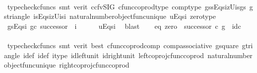 \begin{isabellebody}
\ \ \ \ \isamarkupfalse%
\ {\isacharparenleft}{\kern0pt}typecheck{\isacharunderscore}{\kern0pt}cfuncs{\isacharcomma}{\kern0pt}\ smt\ {\isacharparenleft}{\kern0pt}verit{\isacharcomma}{\kern0pt}\ ccfv{\isacharunderscore}{\kern0pt}SIG{\isacharparenright}{\kern0pt}\ cfunc{\isacharunderscore}{\kern0pt}coprod{\isacharunderscore}{\kern0pt}type\ comp{\isacharunderscore}{\kern0pt}type\ g{\isacharunderscore}{\kern0pt}s{\isacharunderscore}{\kern0pt}s{\isacharunderscore}{\kern0pt}Eqs{\isacharunderscore}{\kern0pt}i{}zUi{}s{\isacharunderscore}{\kern0pt}g{\isacharunderscore}{\kern0pt}s\ g{\isacharunderscore}{\kern0pt}s{\isacharunderscore}{\kern0pt}triangle\ i{}{\isacharunderscore}{\kern0pt}sEqs{\isacharunderscore}{\kern0pt}i{}zUi{}s{\isacharunderscore}{\kern0pt}i{}\ natural{\isacharunderscore}{\kern0pt}number{\isacharunderscore}{\kern0pt}object{\isacharunderscore}{\kern0pt}func{\isacharunderscore}{\kern0pt}unique\ u{\isacharunderscore}{\kern0pt}Eqs{\isacharunderscore}{\kern0pt}i{}\ zero{\isacharunderscore}{\kern0pt}type{\isacharparenright}{\kern0pt}\isanewline
\ \ \isamarkupfalse%
\ \isamarkupfalse%
\ g{\isacharunderscore}{\kern0pt}sEqs{\isacharunderscore}{\kern0pt}i{}{\isacharcolon}{\kern0pt}\ {\isachardoublequoteopen}g{\isasymcirc}\isactrlsub c\ successor\ {\isacharequal}{\kern0pt}\ i{}{\isachardoublequoteclose}\isanewline
\ \ \ \ \isamarkupfalse%
\ u{\isacharunderscore}{\kern0pt}Eqs{\isacharunderscore}{\kern0pt}i{}\ \isamarkupfalse%
\ blast\isanewline
\ \ \isamarkupfalse%
\ eq{}{\isacharcolon}{\kern0pt}\ {\isachardoublequoteopen}{\isacharparenleft}{\kern0pt}zero\ {\isasymamalg}\ successor{\isacharparenright}{\kern0pt}\ {\isasymcirc}\isactrlsub c\ g\ {\isacharequal}{\kern0pt}\ id{\isacharparenleft}{\kern0pt}{\isasymnat}\isactrlsub c{\isacharparenright}{\kern0pt}{\isachardoublequoteclose}\isanewline
\ \ \ \ \isamarkupfalse%
\ {\isacharparenleft}{\kern0pt}typecheck{\isacharunderscore}{\kern0pt}cfuncs{\isacharcomma}{\kern0pt}\ smt\ {\isacharparenleft}{\kern0pt}verit{\isacharcomma}{\kern0pt}\ best{\isacharparenright}{\kern0pt}\ cfunc{\isacharunderscore}{\kern0pt}coprod{\isacharunderscore}{\kern0pt}comp\ comp{\isacharunderscore}{\kern0pt}associative{}\ g{\isacharunderscore}{\kern0pt}square\ g{\isacharunderscore}{\kern0pt}triangle\ i{}{\isacharunderscore}{\kern0pt}def\ i{}{\isacharunderscore}{\kern0pt}def\ i{}{\isacharunderscore}{\kern0pt}type\ id{\isacharunderscore}{\kern0pt}left{\isacharunderscore}{\kern0pt}unit{}\ id{\isacharunderscore}{\kern0pt}right{\isacharunderscore}{\kern0pt}unit{}\ left{\isacharunderscore}{\kern0pt}coproj{\isacharunderscore}{\kern0pt}cfunc{\isacharunderscore}{\kern0pt}coprod\ natural{\isacharunderscore}{\kern0pt}number{\isacharunderscore}{\kern0pt}object{\isacharunderscore}{\kern0pt}func{\isacharunderscore}{\kern0pt}unique\ right{\isacharunderscore}{\kern0pt}coproj{\isacharunderscore}{\kern0pt}cfunc{\isacharunderscore}{\kern0pt}coprod{\isacharparenright}{\kern0pt}\isanewline

\end{isabellebody}
